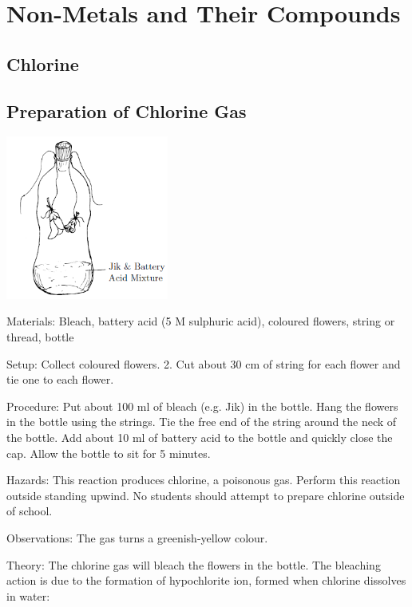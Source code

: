 \section{Non-Metals and Their Compounds} 

\begin{multicols}{2}


\section*{Chlorine} 


\subsection{Preparation of Chlorine Gas}

\begin{center}
\includegraphics[width=0.4\textwidth]{./img/chlorine.png}
\end{center}

\begin{description*}
\item[Materials:]{Bleach, battery acid (5 M sulphuric acid), coloured 
flowers, string or thread,
bottle}
\item[Setup:]{Collect coloured 
flowers.
2. Cut about 30 cm of string for each 
flower and tie one to each flower.}
\item[Procedure:]{Put about 100 ml of bleach (e.g. Jik) in the bottle. Hang the 
flowers in the bottle using the strings. Tie the free end of
the string around the neck of the bottle. Add about 10 ml of battery acid to the bottle and quickly close the cap. Allow the bottle to sit for 5 minutes.}
\item[Hazards:]{This reaction produces chlorine, a poisonous gas. Perform this reaction
outside standing upwind. No students should attempt to
prepare chlorine outside of school.}
\item[Observations:]{The gas turns a greenish-yellow colour.}
\item[Theory:]{The chlorine gas will bleach the 
flowers in the
bottle. The bleaching action is due to the formation of hypochlorite ion,
formed when chlorine dissolves in water: \\

}
\end{description*}
\end{multicols}
